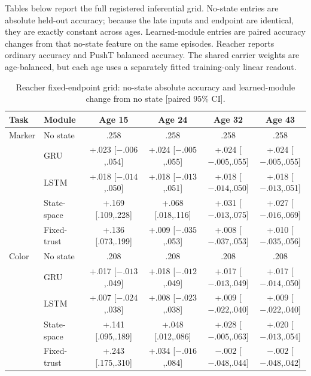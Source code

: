 Tables below report the full registered inferential grid. No-state entries are absolute held-out accuracy; because the late inputs and endpoint are identical, they are exactly constant across ages. Learned-module entries are paired accuracy changes from that no-state feature on the same episodes. Reacher reports ordinary accuracy and PushT balanced accuracy. The shared carrier weights are age-balanced, but each age uses a separately fitted training-only linear readout.

\begin{table}[H]
\centering
\scriptsize
\setlength{\tabcolsep}{1.0pt}
\renewcommand{\arraystretch}{1.08}
\caption{Reacher fixed-endpoint grid: no-state absolute accuracy and learned-module change from no state [paired 95\% CI].}
\begin{tabular}{@{}llcccc@{}}
\toprule
Task & Module & Age 15 & Age 24 & Age 32 & Age 43 \\
\midrule
Marker & No state & .258 & .258 & .258 & .258 \\
 & GRU & +.023 [$-.006$,.054] & +.024 [$-.005$,.055] & +.024 [$-.005$,.055] & +.024 [$-.005$,.055] \\
 & LSTM & +.018 [$-.014$,.050] & +.018 [$-.013$,.051] & +.018 [$-.014$,.050] & +.018 [$-.013$,.051] \\
 & State-space & +.169 [.109,.228] & +.068 [.018,.116] & +.031 [$-.013$,.075] & +.027 [$-.016$,.069] \\
 & Fixed-trust & +.136 [.073,.199] & +.009 [$-.035$,.053] & +.008 [$-.037$,.053] & +.010 [$-.035$,.056] \\
\midrule
Color & No state & .208 & .208 & .208 & .208 \\
 & GRU & +.017 [$-.013$,.049] & +.018 [$-.012$,.049] & +.017 [$-.013$,.049] & +.017 [$-.014$,.050] \\
 & LSTM & +.007 [$-.024$,.038] & +.008 [$-.023$,.038] & +.009 [$-.022$,.040] & +.009 [$-.022$,.040] \\
 & State-space & +.141 [.095,.189] & +.048 [.012,.086] & +.028 [$-.005$,.063] & +.020 [$-.013$,.054] \\
 & Fixed-trust & +.243 [.175,.310] & +.034 [$-.016$,.084] & $-.002$ [$-.048$,.044] & $-.002$ [$-.048$,.042] \\
\bottomrule
\end{tabular}
\end{table}

